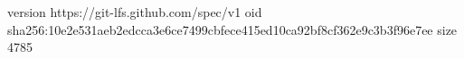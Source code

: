 version https://git-lfs.github.com/spec/v1
oid sha256:10e2e531aeb2edcca3e6ce7499cbfece415ed10ca92bf8cf362e9c3b3f96e7ee
size 4785
